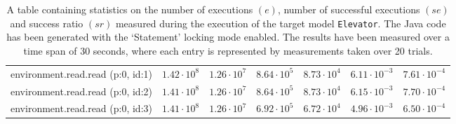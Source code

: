 \begin{table}[htbp]
{\begin{tabular}{lrrrrrr}
\hspace{3mm}environment.read.read (p:0, id:1) & $1.42 \cdot 10^{8}$ & $1.26 \cdot 10^{7}$ & $8.64 \cdot 10^{5}$ & $8.73 \cdot 10^{4}$ & $6.11 \cdot 10^{-3}$ & $7.61 \cdot 10^{-4}$ \\
\hspace{3mm}environment.read.read (p:0, id:2) & $1.41 \cdot 10^{8}$ & $1.26 \cdot 10^{7}$ & $8.64 \cdot 10^{5}$ & $8.73 \cdot 10^{4}$ & $6.15 \cdot 10^{-3}$ & $7.70 \cdot 10^{-4}$ \\
\hspace{3mm}environment.read.read (p:0, id:3) & $1.41 \cdot 10^{8}$ & $1.26 \cdot 10^{7}$ & $6.92 \cdot 10^{5}$ & $6.72 \cdot 10^{4}$ & $4.96 \cdot 10^{-3}$ & $6.50 \cdot 10^{-4}$ \\
\bottomrule
\end{tabular}
}
\caption{A table containing statistics on the number of executions $(e)$, number of successful executions $(se)$ and success ratio $(sr)$ measured during the execution of the target model \texttt{Elevator}. The Java code has been generated with the `Statement' locking mode enabled. The results have been measured over a time span of 30 seconds, where each entry is represented by measurements taken over 20 trials.}
\label{table:frequency_results_elevator_statement}
\end{table}